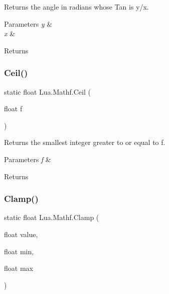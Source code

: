 Returns the angle in radians whose Tan is y/x. 


\begin{DoxyParams}{Parameters}
{\em y} & \\
\hline
{\em x} & \\
\hline
\end{DoxyParams}
\begin{DoxyReturn}{Returns}

\end{DoxyReturn}
\mbox{\label{class_lua_1_1_mathf_aa17eeb105797860b39d5765c5f4a8929}} 
\subsubsection{\texorpdfstring{Ceil()}{Ceil()}}
{\footnotesize\ttfamily static float Lua.\+Mathf.\+Ceil (\begin{DoxyParamCaption}\item[{float}]{f }\end{DoxyParamCaption})\hspace{0.3cm}{\ttfamily [static]}}



Returns the smallest integer greater to or equal to f. 


\begin{DoxyParams}{Parameters}
{\em f} & \\
\hline
\end{DoxyParams}
\begin{DoxyReturn}{Returns}

\end{DoxyReturn}
\mbox{\label{class_lua_1_1_mathf_ad734e258b7adf07ed4a34557d80f0122}} 
\subsubsection{\texorpdfstring{Clamp()}{Clamp()}}
{\footnotesize\ttfamily static float Lua.\+Mathf.\+Clamp (\begin{DoxyParamCaption}\item[{float}]{value,  }\item[{float}]{min,  }\item[{float}]{max }\end{DoxyParamCaption})\hspace{0.3cm}{\ttfamily [static]}}



